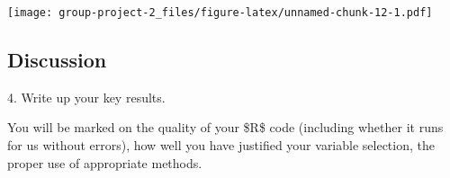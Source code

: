 \documentclass[
]{article}
\begin{document}
\texttt{[image: group-project-2\_files/figure-latex/unnamed-chunk-12-1.pdf]}

\hypertarget{discussion}{%
\subsection{Discussion}\label{discussion}}

4. Write up your key results.

You will be marked on the quality of your \$R\$ code (including whether
it runs for us without errors), how well you have justified your
variable selection, the proper use of appropriate methods.
\end{document}
